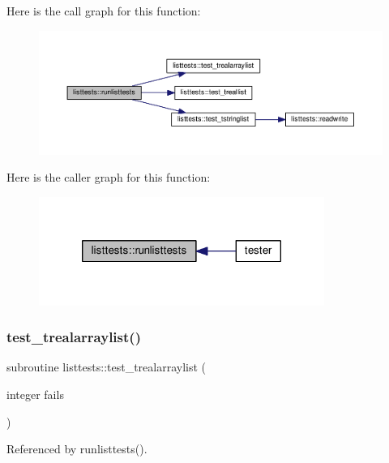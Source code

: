Here is the call graph for this function\+:
\nopagebreak
\begin{figure}[H]
\begin{center}
\leavevmode
\includegraphics[width=350pt]{namespacelisttests_aff7cca94d4e34d14a24b9712b35e46f0_cgraph}
\end{center}
\end{figure}
Here is the caller graph for this function\+:
\nopagebreak
\begin{figure}[H]
\begin{center}
\leavevmode
\includegraphics[width=264pt]{namespacelisttests_aff7cca94d4e34d14a24b9712b35e46f0_icgraph}
\end{center}
\end{figure}
\mbox{\label{namespacelisttests_a1261cd34c8d345e18f28b2f1a5d28fab}} 
\subsubsection{\texorpdfstring{test\+\_\+trealarraylist()}{test\_trealarraylist()}}
{\footnotesize\ttfamily subroutine listtests\+::test\+\_\+trealarraylist (\begin{DoxyParamCaption}\item[{integer}]{fails }\end{DoxyParamCaption})}



Referenced by runlisttests().

